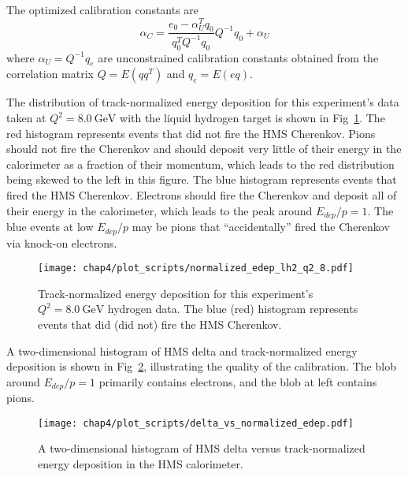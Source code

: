 The optimized calibration constants are
\begin{equation}
    \alpha_C = \frac{e_0 - \alpha_U^T q_0}{q_0^T Q^{-1} q_0} Q^{-1} q_0 + \alpha_U
\end{equation}
where $\alpha_U = Q^{-1}q_e$ are unconstrained calibration constants obtained
from the correlation matrix $Q=E(qq^T)$ and $q_e=E(eq)$.

The distribution of track-normalized energy deposition for this experiment's
data taken at $Q^2=\SI{8.0}{\giga\electronvolt}$ with the liquid hydrogen
target is shown in Fig~\ref{fig:normalized_edep}.
The red histogram represents events that did not fire the HMS Cherenkov.
Pions should not fire the Cherenkov and should deposit very little of their
energy in the calorimeter as a fraction of their momentum, which leads to the
red distribution being skewed to the left in this figure.
The blue histogram represents events that fired the HMS Cherenkov.
Electrons should fire the Cherenkov and deposit all of their energy in the
calorimeter, which leads to the peak around $E_{dep}/p=1$.
The blue events at low $E_{dep}/p$ may be pions that ``accidentally'' fired the
Cherenkov via knock-on electrons.

\begin{figure}[!h]
    \centering
    \texttt{[image: chap4/plot\_scripts/normalized\_edep\_lh2\_q2\_8.pdf]}
    \caption[ Track-normalized energy deposition for this experiment's
            $Q^2=\SI{8.0}{\giga\electronvolt}$ hydrogen data.]{
            Track-normalized energy deposition for this experiment's
            $Q^2=\SI{8.0}{\giga\electronvolt}$ hydrogen data.
            The blue (red) histogram represents events that did (did not) fire the HMS Cherenkov.
            }
    \label{fig:normalized_edep}
\end{figure}

A two-dimensional histogram of HMS delta and track-normalized energy deposition
is shown in Fig~\ref{fig:delta_vs_edep}, illustrating the quality of the
calibration.
The blob around $E_{dep}/p=1$ primarily contains electrons, and the blob at
left contains pions.

\begin{figure}[!h]
    \centering
    \texttt{[image: chap4/plot\_scripts/delta\_vs\_normalized\_edep.pdf]}
    \caption{
            A two-dimensional histogram of HMS delta versus track-normalized
            energy deposition in the HMS calorimeter.
            }
    \label{fig:delta_vs_edep}
\end{figure}

